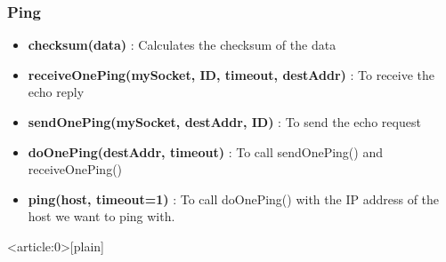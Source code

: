 \documentclass[aspectratio=169]{beamer}
\begin{document}
\begin{frame}
\frametitle{Ping}

\begin{itemize}
    \item \textbf{checksum(data)} : Calculates the checksum of the data
    \item \textbf{receiveOnePing(mySocket, ID, timeout, destAddr)} : To receive the echo reply
    \item \textbf{sendOnePing(mySocket, destAddr, ID)} : To send the echo request
    \item \textbf{doOnePing(destAddr, timeout)} : To call sendOnePing() and receiveOnePing()
    \item \textbf{ping(host, timeout=1)} : To  call doOnePing() with the IP address of the host we want to ping with.
\end{itemize}

\end{frame}

{ %
    \begin{frame}<article:0>[plain]
     \end{frame}
}
\end{document}
